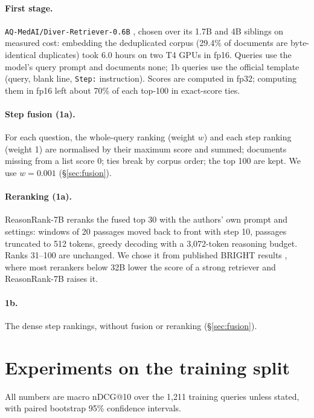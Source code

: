 \documentclass[11pt]{article}
\begin{document}
\paragraph{First stage.} \texttt{AQ-MedAI/Diver-Retriever-0.6B} \citep{sun2025diver}, chosen
over its 1.7B and 4B siblings on measured cost: embedding the deduplicated corpus (29.4\% of
documents are byte-identical duplicates) took 6.0 hours on two T4 GPUs in fp16. Queries use the
model's query prompt and documents none; 1b queries use the official template (query, blank
line, \texttt{Step:} instruction). Scores are computed in fp32; computing them in fp16 left
about 70\% of each top-100 in exact-score ties.

\paragraph{Step fusion (1a).} For each question, the whole-query ranking (weight $w$) and each
step ranking (weight 1) are normalised by their maximum score and summed; documents missing from
a list score 0; ties break by corpus order; the top 100 are kept. We use $w{=}0.001$
(\S\ref{sec:fusion}).

\paragraph{Reranking (1a).} ReasonRank-7B \citep{liu2025reasonrank} reranks the fused top 30
with the authors' own prompt and settings: windows of 20 passages moved back to front with step
10, passages truncated to 512 tokens, greedy decoding with a 3,072-token reasoning budget.
Ranks 31--100 are unchanged. We chose it from published BRIGHT results \citep{su2025bright},
where most rerankers below 32B lower the score of a strong retriever and ReasonRank-7B raises it.

\paragraph{1b.} The dense step rankings, without fusion or reranking (\S\ref{sec:fusion}).

\section{Experiments on the training split}
All numbers are macro nDCG@10 over the 1,211 training queries unless stated, with paired
bootstrap 95\% confidence intervals.
\end{document}
